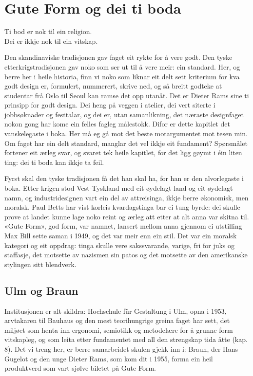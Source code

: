 \chapter{Gute Form og dei ti boda}

\begin{motto}
Ti bod er nok til ein religion.\\ Dei er ikkje nok til ein vitskap.
\end{motto}

Den skandinaviske tradisjonen gav faget eit rykte for å vere godt. Den tyske etterkrigstradisjonen gav noko som ser ut til å vere meir: ein standard. Her, og berre her i heile historia, finn vi noko som liknar eit delt sett kriterium for kva godt design er, formulert, nummerert, skrive ned, og så breitt godteke at studentar frå Oslo til Seoul kan ramse det opp utanåt. Det er Dieter Rams sine ti prinsipp for godt design. Dei heng på veggen i atelier, dei vert siterte i jobbsøknader og festtalar, og dei er, utan samanlikning, det næraste designfaget nokon gong har kome ein felles fagleg målestokk. Difor er dette kapitlet det vanskelegaste i boka. Her må eg gå mot det beste motargumentet mot tesen min. Om faget har ein delt standard, manglar det vel ikkje eit fundament? Spørsmålet fortener eit ærleg svar, og svaret tek heile kapitlet, for det ligg gøymt i éin liten ting: dei ti boda kan ikkje ta feil.

Fyrst skal den tyske tradisjonen få det han skal ha, for han er den alvorlegaste i boka. Etter krigen stod Vest-Tyskland med eit øydelagt land og eit øydelagt namn, og industridesignen vart ein del av attreisinga, ikkje berre økonomisk, men moralsk. Paul Betts har vist korleis kvardagstinga bar ei tung byrde: dei skulle prove at landet kunne lage noko reint og ærleg att etter at alt anna var skitna til\autocite{betts2004}. «Gute Form», god form, var namnet, lansert mellom anna gjennom ei utstilling Max Bill sette saman i 1949, og det var meir enn ein stil. Det var ein moralsk kategori og eit oppdrag: tinga skulle vere sakssvarande, varige, fri for juks og staffasje, det motsette av nazismen sin patos og det motsette av den amerikanske stylingen sitt blendverk.

\section{Ulm og Braun}

Institusjonen er alt skildra: Hochschule für Gestaltung i Ulm, opna i 1953, arvtakaren til Bauhaus og den mest teorihungrige greina faget har sett, det miljøet som henta inn ergonomi, semiotikk og metodelære for å grunne form vitskapleg, og som leita etter fundamentet med all den strengskap tida åtte (kap. 8). Det vi treng her, er berre samarbeidet skulen gjekk inn i: Braun, der Hans Gugelot og den unge Dieter Rams, som kom dit i 1955, forma ein heil produktverd som vart sjølve biletet på Gute Form.

